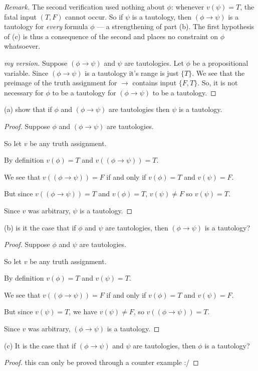 \documentclass{article}
\theoremstyle{remark}\newtheorem{remark}{Remark}
\begin{document}
\medskip
\noindent\emph{Remark.} The second verification used nothing about $\phi$:
whenever $v(\psi) = T$, the fatal input $(T, F)$ cannot occur. So if $\psi$
is a tautology, then $(\phi \rightarrow \psi)$ is a tautology for
\emph{every} formula $\phi$ — a strengthening of part (b). The first
hypothesis of (c) is thus a consequence of the second and places no
constraint on $\phi$ whatsoever.

\begin{proof}[my version]
    Suppose $(\phi \rightarrow \psi)$ and $\psi$ are tautologies. Let $\phi$ be a propositional variable. Since $(\phi \rightarrow \psi)$ is a tautology it's range is just $\{ T \}$. We see that the preimage of the truth assignment for $\rightarrow$ contains input $\{ F, T \}$. So, it is not necessary for $\phi$ to be a tautology for $(\phi \rightarrow \psi)$ to be a tautology.
\end{proof}

\newpage
(a) show that if $\phi$ and $(\phi \rightarrow \psi)$ are tautologies then $\psi$ is a tautology.
\begin{proof}
    Suppose $\phi$ and $(\phi \rightarrow \psi)$ are tautologies.

    So let $v$ be any truth assignment.

    By definition $v(\phi) = T$ and $v((\phi \rightarrow \psi)) = T$.

    We see that $v((\phi \rightarrow \psi)) = F$ if and only if $v(\phi) = T$ and $v(\psi) = F$.

    But since $v((\phi \rightarrow \psi)) = T$ and $v(\phi) = T$, $v(\psi) \neq F$ so $v(\psi) = T$.

    Since $v$ was arbitrary, $\psi$ is a tautology.
\end{proof}

(b) is it the case that if $\phi$ and $\psi$ are tautologies, then $(\phi \rightarrow \psi)$ is a tautology?
\begin{proof}
    Suppose $\phi$ and $\psi$ are tautologies.

    So let $v$ be any truth assignment.

    By definition $v(\phi) = T$ and $v(\psi) = T$.

    We see that $v((\phi \rightarrow \psi)) = F$ if and only if $v(\phi) = T$ and $v(\psi) = F$.

    But since $v(\psi) = T$, we have $v(\psi) \neq F$, so $v((\phi \rightarrow \psi)) = T$.
    
    Since $v$ was arbitrary, $(\phi \rightarrow \psi)$ is a tautology.
\end{proof}

(c) It is the case that if $(\phi \rightarrow \psi)$ and $\psi$ are tautologies, then $\phi$ is a tautology?

\begin{proof}
    this can only be proved through a counter example :/
\end{proof}
\end{document}
